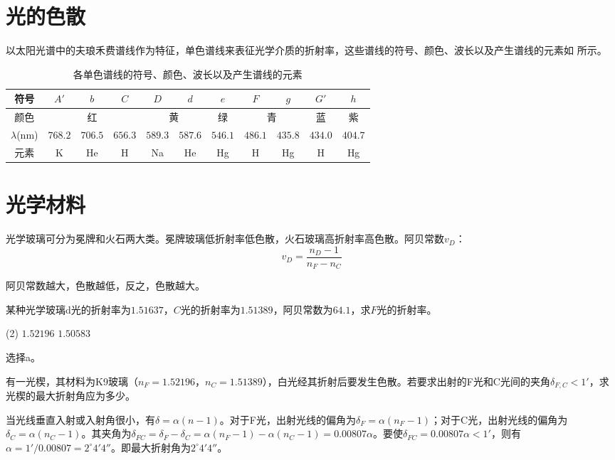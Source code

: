 \documentclass[cn,10pt,chinesefont=founder,math=mtpro2,cite=super,toc=onecol,twoside,openany]{elegantbook}
\begin{document}
\section{光的色散}
以太阳光谱中的夫琅禾费谱线作为特征，单色谱线来表征光学介质的折射率，这些谱线的符号、颜色、波长以及产生谱线的元素如 所示。

\begin{table}[htbp]
	\small
	\centering
	\caption{各单色谱线的符号、颜色、波长以及产生谱线的元素}
	\begin{tabular}{c|c|c|c|c|c|c|c|c|c|c}
		\hline
		符号&$A'$&$b$&$C$&$D$&$d$&$e$&$F$&$g$&$G'$&$h$\\
		\hline
		颜色&\multicolumn{3}{c|}{红}&\multicolumn{2}{c|}{黄}&绿&\multicolumn{2}{c|}{青}&蓝&紫\\
		\hline
		$\lambda$(nm)&$768.2$&$706.5$&$656.3$&$589.3$&$587.6$&$546.1$&$486.1$&$435.8$&$434.0$&$404.7$\\
		\hline
		元素&K&He&H&Na&He&Hg&H&Hg&H&Hg\\
		\hline
	\end{tabular}
	\label{tab:spectral-line}
\end{table}

\section{光学材料}
\label{sect:optical-material}
光学玻璃可分为冕牌和火石两大类。冕牌玻璃低折射率低色散，火石玻璃高折射率高色散。阿贝常数$v_D$：
\begin{equation}
v_D=\frac{n_D-1}{n_F-n_C}
\end{equation}

\begin{property}
	阿贝常数越大，色散越低，反之，色散越大。
\end{property}

\begin{problem}
	某种光学玻璃d光的折射率为$1.51637$，$C$光的折射率为$1.51389$，阿贝常数为$64.1$，求$F$光的折射率。
	\begin{tasks}(2)
		\task $1.52196$
		\task $1.50583$
	\end{tasks}
\end{problem}
\begin{solution}
	选择a。
\end{solution}

\begin{problem}
	有一光楔，其材料为K9玻璃（$n_F=1.52196$，$n_C=1.51389$），白光经其折射后要发生色散。若要求出射的F光和C光间的夹角$\delta_{F,C}<1'$，求光楔的最大折射角应为多少。
\end{problem}
\begin{solution}
	当光线垂直入射或入射角很小，有$\delta=\alpha(n-1)$。对于F光，出射光线的偏角为$\delta_F=\alpha(n_F-1)$；对于C光，出射光线的偏角为$\delta_C=\alpha(n_C-1)$。其夹角为$\delta_{FC}=\delta_F-\delta_C=\alpha(n_F-1)-\alpha(n_C-1)=0.00807\alpha$。要使$\delta_{FC}=0.00807\alpha<1'$，则有$\alpha=1'/0.00807=2^{\circ}4'4''$。即最大折射角为$2^{\circ}4'4''$。
\end{solution}
\end{document}
